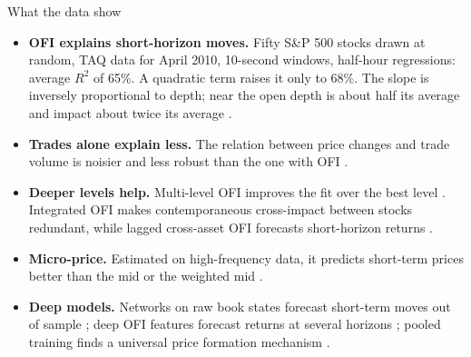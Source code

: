\documentclass[aspectratio=169,10pt]{beamer}
\begin{document}
\begin{frame}{What the data show}
  \small
  \begin{itemize}
    \item \textbf{OFI explains short-horizon moves.} Fifty S\&P 500 stocks drawn at random, TAQ data for April 2010, 10-second windows, half-hour regressions: average $R^2$ of 65\%. A quadratic term raises it only to 68\%. The slope is inversely proportional to depth; near the open depth is about half its average and impact about twice its average \citep{cont2014price}.
    \item \textbf{Trades alone explain less.} The relation between price changes and trade volume is noisier and less robust than the one with OFI \citep{cont2014price}.
    \item \textbf{Deeper levels help.} Multi-level OFI improves the fit over the best level \citep{xu2019multi}. Integrated OFI makes contemporaneous cross-impact between stocks redundant, while lagged cross-asset OFI forecasts short-horizon returns \citep{cont2023cross}.
    \item \textbf{Micro-price.} Estimated on high-frequency data, it predicts short-term prices better than the mid or the weighted mid \citep{stoikov2018micro}.
    \item \textbf{Deep models.} Networks on raw book states forecast short-term moves out of sample \citep{zhang2019deeplob}; deep OFI features forecast returns at several horizons \citep{kolm2023deep}; pooled training finds a universal price formation mechanism \citep{sirignano2019universal}.
  \end{itemize}
\end{frame}
\end{document}
